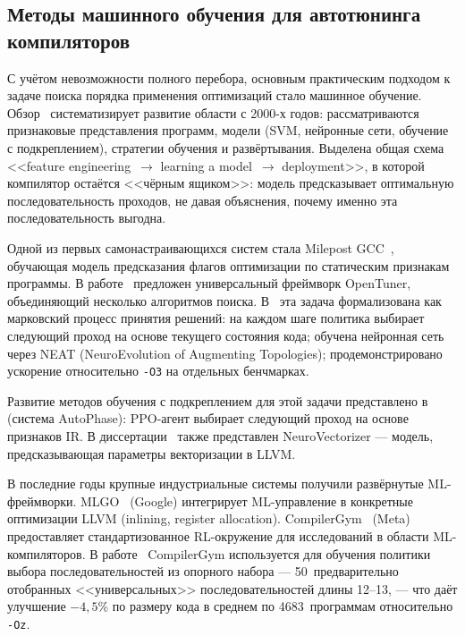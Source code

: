 \subsection{Методы машинного обучения для автотюнинга компиляторов}

С учётом невозможности полного перебора, основным практическим подходом к задаче поиска порядка применения оптимизаций стало машинное обучение. Обзор~\cite{wang2018ml} систематизирует развитие области с 2000-х годов: рассматриваются признаковые представления программ, модели (SVM, нейронные сети, обучение с подкреплением), стратегии обучения и развёртывания. Выделена общая схема <<feature engineering~$\to$ learning a model~$\to$ deployment>>, в которой компилятор остаётся <<чёрным ящиком>>: модель предсказывает оптимальную последовательность проходов, не давая объяснения, почему именно эта последовательность выгодна.

Одной из первых самонастраивающихся систем стала Milepost GCC~\cite{fursin2011milepost}, обучающая модель предсказания флагов оптимизации по статическим признакам программы. В работе~\cite{ansel2014opentuner} предложен универсальный фреймворк OpenTuner, объединяющий несколько алгоритмов поиска. В~\cite{kulkarni2012mitigating} эта задача формализована как марковский процесс принятия решений: на каждом шаге политика выбирает следующий проход на основе текущего состояния кода; обучена нейронная сеть через NEAT (NeuroEvolution of Augmenting Topologies); продемонстрировано ускорение относительно \texttt{-O3} на отдельных бенчмарках.

Развитие методов обучения с подкреплением для этой задачи представлено в~\cite{hajali2020phd, hajali2020autophase} (система AutoPhase): PPO-агент выбирает следующий проход на основе признаков IR. В диссертации~\cite{hajali2020phd} также представлен NeuroVectorizer --- модель, предсказывающая параметры векторизации в LLVM.

В последние годы крупные индустриальные системы получили развёрнутые ML-фреймворки. MLGO~\cite{trofin2021mlgo} (Google) интегрирует ML-управление в конкретные оптимизации LLVM (inlining, register allocation). CompilerGym~\cite{cummins2022compilergym} (Meta) предоставляет стандартизованное RL-окружение для исследований в области ML-компиляторов. В работе~\cite{liang2023learning} CompilerGym используется для обучения политики выбора последовательностей из опорного набора --- 50~предварительно отобранных <<универсальных>> последовательностей длины 12--13, --- что даёт улучшение $-4{,}5\%$ по размеру кода в среднем по 4683~программам относительно \texttt{-Oz}.

